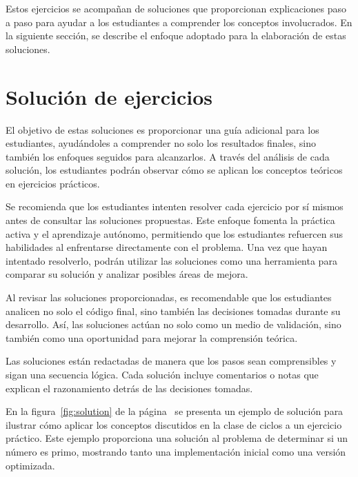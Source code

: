 Estos ejercicios se acompañan de soluciones que proporcionan explicaciones paso a paso para ayudar a los estudiantes a comprender los conceptos involucrados. En la siguiente sección, se describe el enfoque adoptado para la elaboración de estas soluciones.

\section{Solución de ejercicios}

El objetivo de estas soluciones es proporcionar una guía adicional para los estudiantes, ayudándoles a comprender no solo los resultados finales, sino también los enfoques seguidos para alcanzarlos. A través del análisis de cada solución, los estudiantes podrán observar cómo se aplican los conceptos teóricos en ejercicios prácticos.

Se recomienda que los estudiantes intenten resolver cada ejercicio por sí mismos antes de consultar las soluciones propuestas. Este enfoque fomenta la práctica activa y el aprendizaje autónomo, permitiendo que los estudiantes refuercen sus habilidades al enfrentarse directamente con el problema. Una vez que hayan intentado resolverlo, podrán utilizar las soluciones como una herramienta para comparar su solución y analizar posibles áreas de mejora.

Al revisar las soluciones proporcionadas, es recomendable que los estudiantes analicen no solo el código final, sino también las decisiones tomadas durante su desarrollo. Así, las soluciones actúan no solo como un medio de validación, sino también como una oportunidad para mejorar la comprensión teórica.

Las soluciones están redactadas de manera que los pasos sean comprensibles y sigan una secuencia lógica. Cada solución incluye comentarios o notas que explican el razonamiento detrás de las decisiones tomadas.

En la figura~\ref{fig:solution} de la página~\pageref{fig:solution} se presenta un ejemplo de solución para ilustrar cómo aplicar los conceptos discutidos en la clase de ciclos a un ejercicio práctico. Este ejemplo proporciona una solución al problema de determinar si un número es primo, mostrando tanto una implementación inicial como una versión optimizada.


